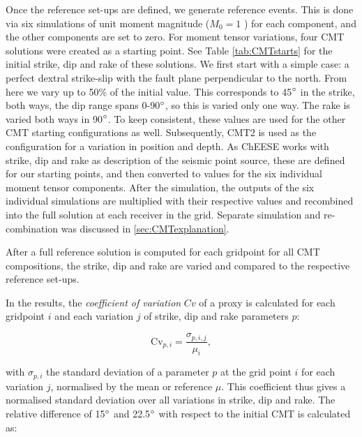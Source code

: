 \documentclass[../Text/00main.tex]{subfiles}
\begin{document}
Once the reference set-ups are defined, we generate reference events. This is done via six simulations of unit moment magnitude ($M_0 = 1$ ) for each component, and the other components are set to zero. For moment tensor variations, four CMT solutions were created as a starting point. See Table \ref{tab:CMTstarts} for the initial strike, dip and rake of these solutions. We first start with a simple case: a perfect dextral strike-slip with the fault plane perpendicular to the north. From here we vary up to 50\% of the initial value. This corresponds to 45$\degree$ in the strike, both ways, the dip range spans 0-90$\degree$, so this is varied only one way. The rake is varied both ways in 90$\degree$. To keep consistent, these values are used for the other CMT starting configurations as well. Subsequently, CMT2 is used as the configuration for a variation in position and depth. As ChEESE works with strike, dip and rake as description of the seismic point source, these are defined for our starting points, and then converted to values for the six individual moment tensor components. After the simulation, the outputs of the six individual simulations are multiplied with their respective values and recombined into the full solution at each receiver in the grid. Separate simulation and re-combination was discussed in  \ref{sec:CMTexplanation}. 

After a full reference solution is computed for each gridpoint for all CMT compositions, the strike, dip and rake are varied and compared to the respective reference set-ups. 

In the results, the \textit{coefficient of variation} $Cv$ of a proxy is calculated for each gridpoint $i$ and each variation $j$ of strike, dip and rake parameters $p$:

\begin{equation}
\text{Cv}_{p, i} = \frac{\sigma_{p, i, j}}{\mu_{i}},
\end{equation}

with $\sigma_{p,i}$ the standard deviation of a parameter $p$ at the grid point $i$ for each variation $j$, normalised by the mean or reference $\mu$. This coefficient thus gives a normalised standard deviation over all variations in strike, dip and rake. The relative difference of 15$\degree$ and 22.5$\degree$ with respect to the initial CMT is calculated as:
\end{document}
